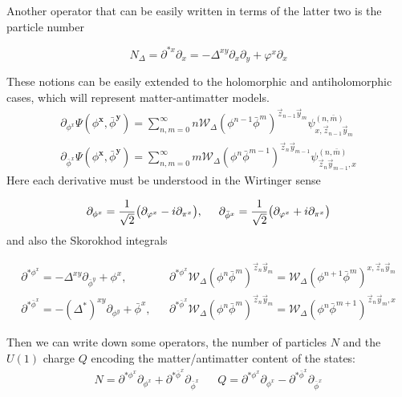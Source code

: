 \documentclass[12pt]{article}%
\begin{document}
Another operator that can be easily written in terms of the latter two is the particle number 

\begin{equation}
\label{eq:particleNumber}
N_{\Delta}=\partial^{*x}\partial_x=-\Delta^{xy}\partial_x\partial_y+\varphi^x\partial_x
\end{equation}

These notions can be easily extended to the holomorphic and antiholomorphic cases, which will represent matter-antimatter  models. 
\begin{gather}
\label{eq:holomorphicMalliavin}
\partial_{\phi^x}\Psi(\phi^{\mathbf{x}},\bar\phi^\mathbf{y})=\sum_{n,m=0}^\infty n\mathcal{W}_\Delta(\phi^{n-1}\bar{\phi}^m)^{\vec{z}_{n-1}\vec{y}_m}\psi^{(n,\bar{m})}_{x,\vec{z}_{n-1}\vec{y}_m} \\
\partial_{\bar\phi^x}\Psi(\phi^{\mathbf{x}},\bar\phi^\mathbf{y})=\sum_{n,m=0}^\infty m\mathcal{W}_\Delta(\phi^{n}\bar{\phi}^{m-1})^{\vec{z}_{n}\vec{y}_{m-1}}\psi^{(n,\bar{m})}_{\vec{z}_{n}\vec{y}_{m-1},x} 
\end{gather}
Here each derivative must be understood in the Wirtinger sense 

\begin{equation}
\label{eq:wirtinger}
\partial_{\phi^x}=\frac{1}{\sqrt{2}}\big(\partial_{\varphi^x}-i \partial_{\pi^x} \big),\hspace{0.5 cm} \partial_{\bar\phi^x}=\frac{1}{\sqrt{2}}\big(\partial_{\varphi^x}+i \partial_{\pi^x} \big)
\end{equation}
and also the Skorokhod integrals  

\begin{align}
\label{eq:holomorphicSkorokhod}
\partial^{*\phi^x} =-\Delta^{xy}\partial_{\bar\phi^y}+\phi^x, & &\partial^{*\phi^x}\mathcal{W}_\Delta(\phi^{n}\bar{\phi}^m)^{\vec{z}_{n}\vec{y}_m}= \mathcal{W}_\Delta(\phi^{n+1}\bar{\phi}^m)^{x,\vec{z}_{n}\vec{y}_m}\nonumber \\
\partial^{*\bar\phi^x} =-(\Delta^*)^{xy}\partial_{\phi^y}+\bar\phi^x, & &\partial^{*\bar\phi^x}\mathcal{W}_\Delta(\phi^{n}\bar{\phi}^m)^{\vec{z}_{n}\vec{y}_m}= \mathcal{W}_\Delta(\phi^{n}\bar{\phi}^{m+1})^{\vec{z}_{n}\vec{y}_m,x}
\end{align}

Then we can write down some operators, the number of particles $N$ and the $U(1)$ charge $Q$ encoding the matter/antimatter content of the states:
\begin{align}
\label{eq:ChargeAndNumber}
    N=\partial^{*\phi^x}\partial_{\phi^x}+ \partial^{*\bar\phi^x}\partial_{\bar\phi^x} & & Q=\partial^{*\phi^x}\partial_{\phi^x}- \partial^{*\bar\phi^x}\partial_{\bar\phi^x}
\end{align}
\end{document}
